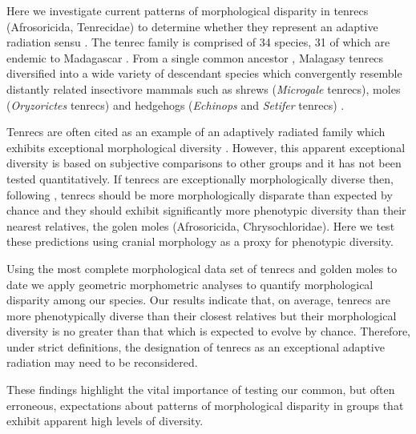 \documentclass[12pt,a4paper]{article}
\begin{document}

Here we investigate current patterns of morphological disparity in tenrecs (Afrosoricida, Tenrecidae) to determine whether they represent an adaptive radiation sensu \citep{Losos2010a}. The tenrec family is comprised of 34 species, 31 of which are endemic to Madagascar \citep{Olson2013}. From a single common ancestor \citep{Asher2006}, Malagasy tenrecs diversified into a wide variety of descendant species which convergently resemble distantly related insectivore mammals such as shrews (\textit{Microgale} tenrecs), moles (\textit{Oryzorictes} tenrecs) and hedgehogs (\textit{Echinops} and \textit{Setifer} tenrecs) \citep{Eisenberg1969}.

Tenrecs are often cited as an example of an adaptively radiated family which exhibits exceptional morphological diversity \citep{Soarimalala2011, Olson2003, Eisenberg1969}. However, this apparent exceptional diversity is based on subjective comparisons to other groups and it has not been tested quantitatively. If tenrecs are exceptionally morphologically diverse then, following \citep{Losos2010a}, tenrecs should be more morphologically disparate than expected by chance and they should exhibit significantly more phenotypic diversity than their nearest relatives, the golen moles (Afrosoricida, Chrysochloridae). Here we test these predictions using cranial morphology as a proxy for phenotypic diversity.



Using the most complete morphological data set of tenrecs and golden moles to date we apply geometric morphometric analyses \citep{Rohlf1993, Zelditch2012} to quantify morphological disparity among our species. Our results indicate that, on average, tenrecs are more phenotypically diverse than their closest relatives but their morphological diversity is no greater than that which is expected to evolve by chance.
Therefore, under strict definitions, the designation of tenrecs as an exceptional adaptive radiation may need to be reconsidered. 

These findings highlight the vital importance of testing our common, but often erroneous, expectations about patterns of morphological disparity in groups that exhibit apparent high levels of diversity. 
\end{document}
